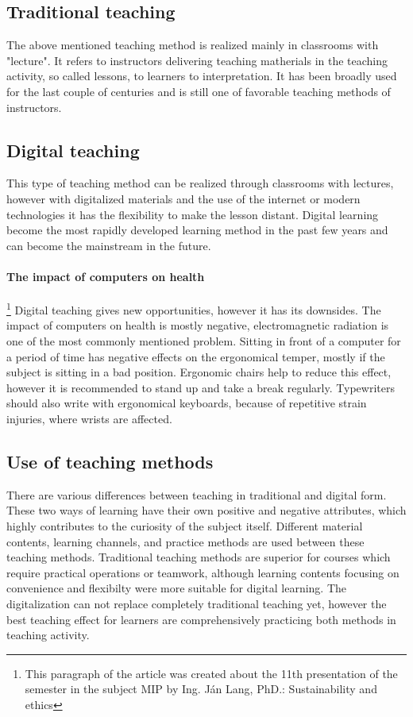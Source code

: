 \documentclass[10pt,oneside,english,a4paper]{article}
\begin{document}
\subsection{Traditional teaching}\label{3.1}

	The above mentioned teaching method is realized mainly in classrooms with "lecture". It refers to instructors delivering teaching matherials in the teaching activity, so called lessons, to learners to interpretation. It has been broadly used for the last couple of centuries and is still one of favorable teaching methods of instructors.\cite{Lin2017}

\subsection{Digital teaching}\label{3.2}

	This type of teaching method can be realized through classrooms with lectures, however with digitalized materials and the use of the internet or modern technologies it has the flexibility to make the lesson distant. Digital learning become the most rapidly developed learning method in the past few years and can become the mainstream in the future.\cite{Lin2017}

\paragraph{The impact of computers on health}\footnote{This paragraph of the article was created about the 11th presentation of the semester in the subject MIP by Ing. Ján Lang, PhD.: Sustainability and ethics} Digital teaching gives new opportunities, however it has its downsides. The impact of computers on health is mostly negative, electromagnetic radiation is one of the most commonly mentioned problem. Sitting in front of a computer for a period of time has negative effects on the ergonomical temper, mostly if the subject is sitting in a bad position. Ergonomic chairs help to reduce this effect, however it is recommended to stand up and take a break regularly. Typewriters should also write with ergonomical keyboards, because of repetitive strain injuries, where wrists are affected.

\subsection{Use of teaching methods}\label{3.3}

	There are various differences between teaching in traditional and digital form. These two ways of learning have their own positive and negative attributes, which highly contributes to the curiosity of the subject itself. Different material contents, learning channels, and practice methods are used between these teaching methods. Traditional teaching methods are superior for courses which require practical operations or teamwork, although learning contents focusing on convenience and flexibilty were more suitable for digital  learning. The digitalization can not replace completely traditional teaching yet, however the best teaching effect for learners are comprehensively practicing both methods in teaching activity.\cite{Lin2017}
\end{document}
